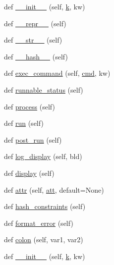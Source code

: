 \begin{DoxyCompactItemize}
def \hyperlink{classwaflib_1_1_task_1_1_task_base_add6ae927b00bd1f14d5b87738dd53e70}{\+\_\+\+\_\+init\+\_\+\+\_\+} (self, \hyperlink{rfft2d_test_m_l_8m_adc468c70fb574ebd07287b38d0d0676d}{k}, kw)
\item 
def \hyperlink{classwaflib_1_1_task_1_1_task_base_a004a67fbb5d7e36d1a6ba48390e0d5f7}{\+\_\+\+\_\+repr\+\_\+\+\_\+} (self)
\item 
def \hyperlink{classwaflib_1_1_task_1_1_task_base_a07123f80c95b1d17a699064cd10d8885}{\+\_\+\+\_\+str\+\_\+\+\_\+} (self)
\item 
def \hyperlink{classwaflib_1_1_task_1_1_task_base_a5e02f89716bcd37b2490adc0861c4bdd}{\+\_\+\+\_\+hash\+\_\+\+\_\+} (self)
\item 
def \hyperlink{classwaflib_1_1_task_1_1_task_base_a6326ff82d67a2b629c8d78b95cb8fec6}{exec\+\_\+command} (self, \hyperlink{sndfile__play_8m_adfc5ba7e22f5e4a6221c12a70503bef3}{cmd}, kw)
\item 
def \hyperlink{classwaflib_1_1_task_1_1_task_base_a10c4597d9085bd1680f9b3eb28e23899}{runnable\+\_\+status} (self)
\item 
def \hyperlink{classwaflib_1_1_task_1_1_task_base_ae5e951a187c8d09c31960bbcf76fad25}{process} (self)
\item 
def \hyperlink{classwaflib_1_1_task_1_1_task_base_ae549bc1a80fd94cc94fd1e764c76895c}{run} (self)
\item 
def \hyperlink{classwaflib_1_1_task_1_1_task_base_a21b09d3f18df76e1d8b0719f321ea3bd}{post\+\_\+run} (self)
\item 
def \hyperlink{classwaflib_1_1_task_1_1_task_base_adf380fd031fc987f4dcd54e1f70420a7}{log\+\_\+display} (self, bld)
\item 
def \hyperlink{classwaflib_1_1_task_1_1_task_base_a838316cf55ac50fab2ae0e8771917e74}{display} (self)
\item 
def \hyperlink{classwaflib_1_1_task_1_1_task_base_a8ead2ec09545f4e9e27d6b40f9f80eaa}{attr} (self, \hyperlink{filters_8h_a6cbe32dd86cefd1a8b182b3ee652e9bf}{att}, default=None)
\item 
def \hyperlink{classwaflib_1_1_task_1_1_task_base_ad4f2583a59ff62565735490154826033}{hash\+\_\+constraints} (self)
\item 
def \hyperlink{classwaflib_1_1_task_1_1_task_base_a321e667402035aa56626ee6f7b3b8223}{format\+\_\+error} (self)
\item 
def \hyperlink{classwaflib_1_1_task_1_1_task_base_ae9648ec691e059291a79f38ef6ee12cc}{colon} (self, var1, var2)
\item 
def \hyperlink{classwaflib_1_1_task_1_1_task_base_add6ae927b00bd1f14d5b87738dd53e70}{\+\_\+\+\_\+init\+\_\+\+\_\+} (self, \hyperlink{rfft2d_test_m_l_8m_adc468c70fb574ebd07287b38d0d0676d}{k}, kw)

\end{DoxyCompactItemize}
